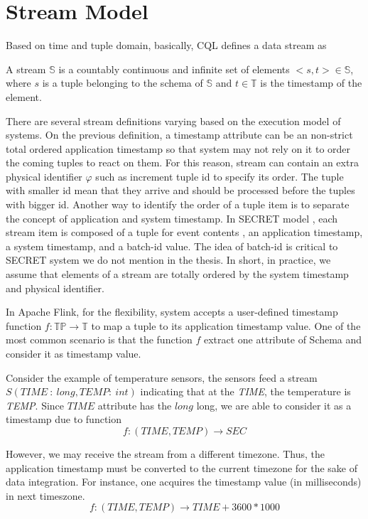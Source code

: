 \section{Stream Model}


Based on time and tuple domain, basically, CQL \citep{Arasu:2006:CCQ} defines a data stream as
\begin{defi}
	A stream $\mathbb{S}$ is a countably continuous and infinite set of elements $<s,t> \in \mathbb{S}$, where $s$ is a tuple belonging to the schema of $\mathbb{S}$ and $t \in \mathbb{T}$ is the timestamp of the element. 
\end{defi}

There are several stream definitions varying based on the execution model of systems. On the previous definition, a timestamp attribute can be an non-strict total ordered application timestamp so that system may not rely on it to order the coming tuples to react on them. For this reason, stream can contain an extra physical identifier  $\varphi$ \citep{Petit:2010} such as increment tuple id to specify its order. The tuple with smaller id mean that they arrive and should be processed before the tuples with bigger id. Another way to identify the order of a tuple item is to separate the concept of application and system timestamp. In SECRET model \citep{Botan:2010}, each stream item is composed of a tuple for event contents , an application timestamp, a system timestamp, and a batch-id value. The idea of batch-id is critical to SECRET system we do not mention in the thesis.
In short, in practice, we assume that elements of a stream are totally ordered by the system timestamp and physical identifier.

In Apache Flink, for the flexibility, system accepts a user-defined timestamp function   $f: \mathbb{TP} \rightarrow \mathbb{T}$ to map a tuple to its application timestamp value. One of the most common scenario is that the function $f$ extract one attribute of Schema and consider it as timestamp value.

Consider the example of temperature sensors, the sensors feed a stream $S(TIME\ :\ long,TEMP:\ int)$ indicating that at the \textit{TIME}, the temperature is \textit{TEMP}. Since $TIME$ attribute has the $long$ long, we are able to consider it as a timestamp due to function
\begin{equation}
f: (TIME, TEMP) \rightarrow SEC
\end{equation}

However, we may receive the stream from a different timezone. Thus, the application timestamp must be converted to the current timezone for the sake of data integration. For instance, one acquires the timestamp value (in milliseconds) in next timeszone.
\begin{equation}
f: (TIME, TEMP) \rightarrow TIME + 3600*1000
\end{equation}


